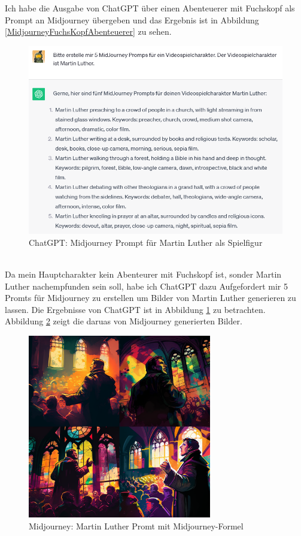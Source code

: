 Ich habe die Ausgabe von ChatGPT über einen Abenteuerer mit Fuchskopf als Prompt an Midjourney übergeben und das Ergebnis ist in Abbildung \ref{MidjourneyFuchsKopfAbenteuerer} zu sehen.
\\
\begin{figure}
	\centering
	\includegraphics[scale=0.7]{BilderFuerBA/07.png}
	\caption{ChatGPT: Midjourney Prompt für Martin Luther als Spielfigur}
	\label{chatgptMartinLutherMJformelErstenFünf}
\end{figure}
\\
Da mein Hauptcharakter kein Abenteurer mit Fuchskopf ist, sonder Martin Luther nachempfunden sein soll, habe ich ChatGPT dazu Aufgefordert mir 5 Promts für Midjourney zu erstellen um Bilder von Martin Luther generieren zu lassen. Die Ergebnisse von ChatGPT ist in Abbildung \ref{chatgptMartinLutherMJformelErstenFünf} zu betrachten. Abbildung \ref{MidJourneyMLMitFormel} zeigt die daruas von Midjourney generierten Bilder.
\begin{figure}
	\centering
	\includegraphics[width=8.022cm]{BilderFuerBA/MidJourneyMLMitFormel.png}
	\caption{Midjourney: Martin Luther Promt mit Midjourney-Formel}
	\label{MidJourneyMLMitFormel}
\end{figure}

